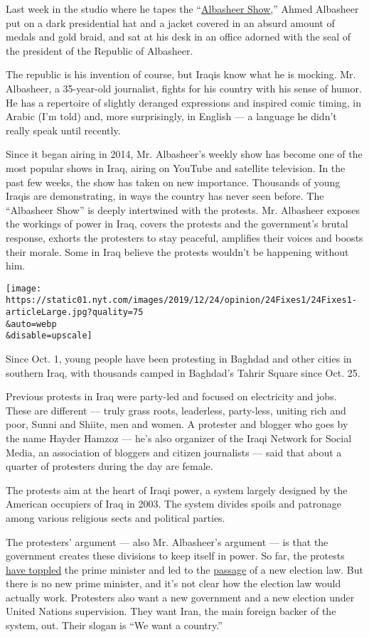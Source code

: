 Last week in the studio where he tapes the
``\href{https://www.youtube.com/channel/UCjxrFnMg_scE7fkw_Ip0_yA}{Albasheer
Show},'' Ahmed Albasheer put on a dark presidential hat and a jacket
covered in an absurd amount of medals and gold braid, and sat at his
desk in an office adorned with the seal of the president of the Republic
of Albasheer.

The republic is his invention of course, but Iraqis know what he is
mocking. Mr. Albasheer, a 35-year-old journalist, fights for his country
with his sense of humor. He has a repertoire of slightly deranged
expressions and inspired comic timing, in Arabic (I'm told) and, more
surprisingly, in English --- a language he didn't really speak until
recently.

Since it began airing in 2014, Mr. Albasheer's weekly show has become
one of the most popular shows in Iraq, airing on YouTube and satellite
television. In the past few weeks, the show has taken on new importance.
Thousands of young Iraqis are demonstrating, in ways the country has
never seen before. The ``Albasheer Show'' is deeply intertwined with the
protests. Mr. Albasheer exposes the workings of power in Iraq, covers
the protests and the government's brutal response, exhorts the
protesters to stay peaceful, amplifies their voices and boosts their
morale. Some in Iraq believe the protests wouldn't be happening without
him.

\texttt{[image: https://static01.nyt.com/images/2019/12/24/opinion/24Fixes1/24Fixes1-articleLarge.jpg?quality=75\\\&auto=webp\\\&disable=upscale]}

Since Oct. 1, young people have been protesting in Baghdad and other
cities in southern Iraq, with thousands camped in Baghdad's Tahrir
Square since Oct. 25.

Previous protests in Iraq were party-led and focused on electricity and
jobs. These are different --- truly grass roots, leaderless, party-less,
uniting rich and poor, Sunni and Shiite, men and women. A protester and
blogger who goes by the name Hayder Hamzoz --- he's also organizer of
the Iraqi Network for Social Media, an association of bloggers and
citizen journalists --- said that about a quarter of protesters during
the day are female.

The protests aim at the heart of Iraqi power, a system largely designed
by the American occupiers of Iraq in 2003. The system divides spoils and
patronage among various religious sects and political parties.

The protesters' argument --- also Mr. Albasheer's argument --- is that
the government creates these divisions to keep itself in power. So far,
the protests
\href{https://www.nytimes.com/2019/11/29/world/middleeast/iraq-prime-minister-mahdi-resign.html}{have
toppled} the prime minister and led to the
\href{https://www.nytimes.com/2019/12/24/world/middleeast/iraq-election-law.html}{passage}
of a new election law. But there is no new prime minister, and it's not
clear how the election law would actually work. Protesters also want a
new government and a new election under United Nations supervision. They
want Iran, the main foreign backer of the system, out. Their slogan is
``We want a country.''

